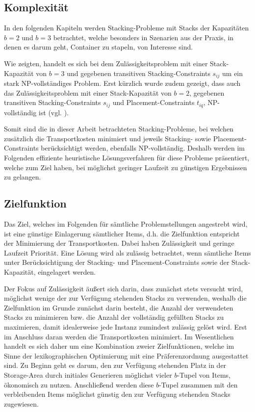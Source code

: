 \subsection{Komplexität}
\label{sec:complexity}

In den folgenden Kapiteln werden Stacking-Probleme mit Stacks der Kapazitäten $b = 2$
und $b = 3 $ betrachtet, welche besonders in Szenarien aus der Praxis, in denen es darum geht,
Container zu stapeln, von Interesse sind.

Wie \citet{Bruns2015} zeigten, handelt es sich bei dem Zulässigkeitsproblem mit einer Stack-Kapazität von $b=3$ und gegebenen transitiven Stacking-Constraints $s_{ij}$ um ein stark NP-vollständiges Problem. Erst kürzlich wurde zudem gezeigt, dass auch das Zulässigkeitsproblem mit einer Stack-Kapazität von $b=2$, gegebenen transitiven
Stacking-Constraints $s_{ij}$ und Placement-Constraints $t_{iq}$, NP-vollständig ist (vgl. \citet{Chernykh2019}).

Somit sind die in dieser Arbeit betrachteten Stacking-Probleme, bei welchen zusätzlich die Transportkosten minimiert
und jeweils Stacking- sowie Placement-Constraints berücksichtigt werden, ebenfalls NP-vollständig.
Deshalb werden im Folgenden effiziente heuristische Lösungsverfahren für diese Probleme präsentiert,
welche zum Ziel haben, bei möglichst geringer Laufzeit zu günstigen Ergebnissen zu gelangen.

\subsection{Zielfunktion}
\label{sec:objective}

Das Ziel, welches im Folgenden für sämtliche Problemstellungen angestrebt wird, ist eine günstige
Einlagerung sämtlicher Items, d.h. die Zielfunktion entspricht der Minimierung der Transportkosten.
Dabei haben Zulässigkeit und geringe Laufzeit Priorität. Eine Lösung wird als zulässig betrachtet,
wenn sämtliche Items unter Berücksichtigung der Stacking- und Placement-Constraints sowie der Stack-Kapazität,
eingelagert werden.

\vfill
\pagebreak

Der Fokus auf Zulässigkeit äußert sich darin, dass zunächst stets versucht wird, möglichst wenige der zur Verfügung stehenden Stacks zu verwenden, weshalb die Zielfunktion im Grunde zunächst darin besteht, die Anzahl der verwendeten Stacks zu minimieren bzw. die Anzahl der vollständig gefüllten Stacks zu maximieren, damit idealerweise jede Instanz zumindest zulässig gelöst wird.
Erst im Anschluss daran werden die Transportkosten minimiert.
Im Wesentlichen handelt es sich daher um eine Kombination zweier Zielfunktionen,
welche im Sinne der lexikographischen Optimierung mit eine Präferenzordnung ausgestattet sind.
Zu Beginn geht es darum, den zur Verfügung stehenden Platz in der Storage-Area durch initiales Generieren
möglichst vieler $b$-Tupel von Items, ökonomisch zu nutzen. Anschließend werden diese $b$-Tupel
zusammen mit den verbleibenden Items möglichst günstig den zur Verfügung stehenden Stacks zugewiesen.

